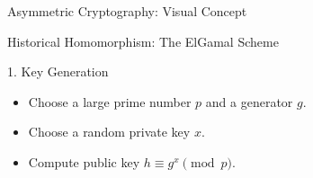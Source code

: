 \documentclass[aspectratio=169, 10pt]{beamer}
\begin{document}
\begin{frame}{Asymmetric Cryptography: Visual Concept}
\begin{center}
{
    }
    \end{center}
\end{frame}

\begin{frame}{Historical Homomorphism: The ElGamal Scheme}
    \begin{block}{1. Key Generation}
        \begin{itemize}
            \item Choose a large prime number $p$ and a generator $g$.
            \item Choose a random private key $x$.
            \item Compute public key $h \equiv g^x \pmod p$.
        \end{itemize}
    \end{block}
    

\end{frame}
\end{document}
